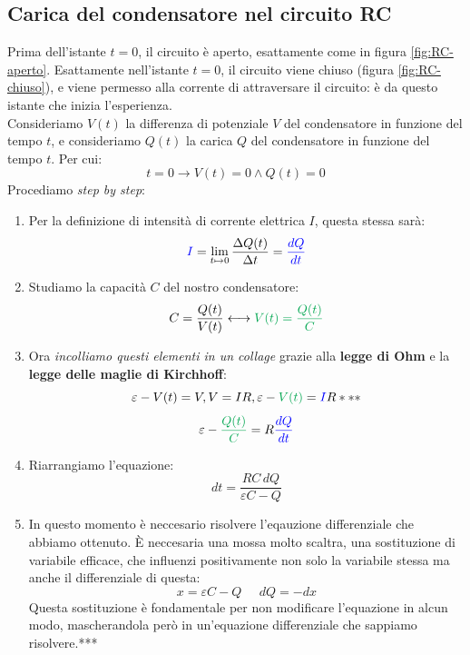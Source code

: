 \documentclass[a3paper, twoside, openany]{book}
\theoremstyle{definition}
\begin{document}
\subsection{Carica del condensatore nel circuito RC}
Prima dell'istante $t=0$, il circuito è aperto, esattamente come in figura \ref{fig:RC-aperto}. Esattamente nell'istante $t=0$, il circuito viene chiuso (figura \ref{fig:RC-chiuso}), e viene permesso alla corrente di attraversare il circuito: è da questo istante che inizia l'esperienza. \\ Consideriamo $V(t)$ la differenza di potenziale $V$ del condensatore in funzione del tempo $t$, e consideriamo $Q(t)$ la carica $Q$ del condensatore in funzione del tempo $t$. Per cui: $$t=0\longrightarrow V(t)=0 \wedge Q(t)=0$$ Procediamo \emph{step by step}:
\begin{enumerate}
\item Per la definizione di intensità di corrente elettrica $I$, questa stessa sarà: \begin{equation}\textcolor{blue}{I}=\lim_{t\mapsto 0}\frac{\Delta Q(t)}{\Delta t}=\textcolor{blue}{\frac{dQ}{dt}}\end{equation}
\item Studiamo la capacità $C$ del nostro condensatore: \begin{equation}C=\frac{Q(t)}{V(t)}\longleftrightarrow \textcolor{Green}{V(t)=\frac{Q(t)}{C}}\end{equation}
\item Ora \emph{incolliamo questi elementi in un collage} grazie alla \textbf{legge di Ohm} e la \textbf{legge delle maglie di Kirchhoff}: \begin{equation}\varepsilon-V(t)=V,V=IR,\varepsilon-\textcolor{Green}{V(t)}=\textcolor{blue}{I}R***\end{equation} \begin{equation}\varepsilon-\textcolor{Green}{\frac{Q(t)}{C}}=R\textcolor{blue}{\frac{dQ}{dt}}\end{equation}
\item Riarrangiamo l'equazione: \begin{equation}dt=\frac{RC\,dQ}{\varepsilon C-Q}\end{equation}
\item In questo momento è neccesario risolvere l'eqauzione differenziale che abbiamo ottenuto. È neccesaria una mossa molto scaltra, una sostituzione di variabile efficace, che influenzi positivamente non solo la variabile stessa ma anche il differenziale di questa: \begin{equation}x=\varepsilon C-Q\;\;\;\;\;dQ=-dx\end{equation} Questa sostituzione è fondamentale per non modificare l'equazione in alcun modo, mascherandola però in un'equazione differenziale che sappiamo risolvere.***

\end{enumerate}
\end{document}
